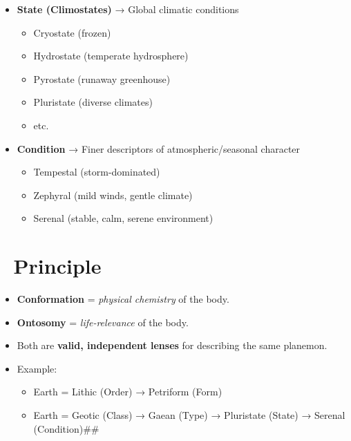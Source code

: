 \documentclass[
  letterpaper,
]{book}
\providecommand{\tightlist}{%
  \setlength{\itemsep}{0pt}\setlength{\parskip}{0pt}}
\begin{document}
\begin{itemize}
\tightlist
\item
  \textbf{State (Climostates)} → Global climatic conditions

  \begin{itemize}
  \tightlist
  \item
    Cryostate (frozen)\\
  \item
    Hydrostate (temperate hydrosphere)\\
  \item
    Pyrostate (runaway greenhouse)\\
  \item
    Pluristate (diverse climates)\\
  \item
    etc.
  \end{itemize}
\item
  \textbf{Condition} → Finer descriptors of atmospheric/seasonal
  character

  \begin{itemize}
  \tightlist
  \item
    Tempestal (storm-dominated)\\
  \item
    Zephyral (mild winds, gentle climate)\\
  \item
    Serenal (stable, calm, serene environment)
  \end{itemize}
\end{itemize}

\section{🧭 Principle}\label{principle-1}

\begin{itemize}
\tightlist
\item
  \textbf{Conformation} = \emph{physical chemistry} of the body.\\
\item
  \textbf{Ontosomy} = \emph{life-relevance} of the body.\\
\item
  Both are \textbf{valid, independent lenses} for describing the same
  planemon.
\item
  Example:

  \begin{itemize}
  \tightlist
  \item
    Earth = Lithic (Order) → Petriform (Form)\\
  \item
    Earth = Geotic (Class) → Gaean (Type) → Pluristate (State) → Serenal
    (Condition)\#\#
  \end{itemize}
\end{itemize}
\end{document}
